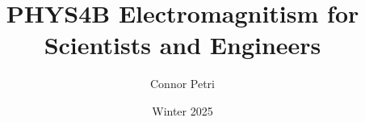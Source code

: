 \documentclass[12pt, letterpaper]{article}
\title{PHYS4B Electromagnitism for Scientists and Engineers}
\author{Connor Petri}
\date{Winter 2025}
\begin{document}
\maketitle
\tableofcontents
\pagebreak






\end{document}
